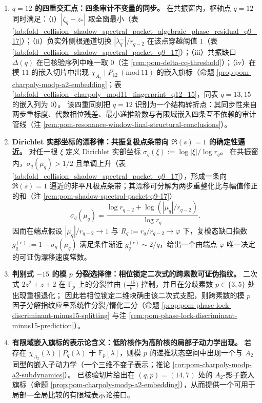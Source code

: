 \begin{enumerate}
  \item \textbf{\texorpdfstring{$q=12$}{q=12} 的四重交汇点：四条审计不变量的同步。}
  在共振窗内，枢轴点 \(q=12\) 同时满足：（i）\(|\zeta_q-z_\ast|\) 取全窗最小（表 \ref{tab:fold_collision_shadow_spectral_packet_algebraic_phase_residual_q9_17}）；（ii）负实外侧根通道切换 \(|\lambda_q^-|/r_{q-2}\) 在该点穿越阈值 \(1\)（表 \ref{tab:fold_collision_shadow_spectral_packet_q9_17}）；（iii）共振缺口 \(\Delta(q)\) 在已核验序列中唯一取 \(0\)（注 \ref{rem:pom-delta-cq-threshold}）；（iv）在模 \(11\) 的嵌入切片中出现 \(\chi_{A_2}\mid P_{12}\ (\mathrm{mod}\ 11)\) 的嵌入旗标（命题 \ref{prop:pom-charpoly-modp-a2-embedding}；表 \ref{tab:fold_collision_charpoly_mod11_fingerprint_q12_15}，同表 \(q=13,15\) 的嵌入列为 \(0\)）。
  该四重同刻把 \(q=12\) 识别为一个结构转折点：其同步性来自两步重标度、代数相位残差、最小递推阶数与有限域嵌入四条互不依赖的审计管线（注 \ref{rem:pom-resonance-window-final-structural-conclusions}）。

  \item \textbf{Dirichlet 实部坐标的漂移律：共振复极点条带向 \texorpdfstring{$\Re(s)=1$}{Re(s)=1} 的确定性逼近。}
  对任一根 \(\xi\) 定义 Dirichlet 实部坐标 \(\sigma_q(\xi):=\log|\xi|/\log r_q\)。
  在共振窗内，\(\sigma_q(\mu_q)>1/2\) 且单调上升（表 \ref{tab:fold_collision_shadow_spectral_packet_q9_17}），形成一条向 \(\Re(s)=1\) 逼近的非平凡极点条带；其漂移可分解为两步重整化比与幅值修正的和（注 \ref{rem:pom-shadow-spectral-packet-q9-17}）
  \[
  \sigma_q(\mu_q)=\frac{\log r_{q-2}+\log(|\mu_q|/r_{q-2})}{\log r_q}.
  \]
  因而在端点假设 \(|\mu_q|/r_{q-2}\to 1\) 与 \(R_q:=r_q/r_{q-2}\to\varphi\) 下，复模态缺口指数 \(g_q^{(c)}:=1-\sigma_q(\mu_q)\) 满足条件渐近 \(g_q^{(c)}\sim 2/q\)，给出一个由端点 \(\varphi\) 唯一决定的可证伪漂移速度常数。

  \item \textbf{判别式 \texorpdfstring{$-15$}{-15} 的模 \texorpdfstring{$p$}{p} 分裂选择律：相位锁定二次式的跨素数可证伪指纹。}
  二次式 \(2z^2+z+2\) 在 \(\mathbb{F}_p\) 上的分裂性由 \(\bigl(\frac{-15}{p}\bigr)\) 控制，并且在分歧素数 \(p\in\{3,5\}\) 处出现重根退化；
  因此若相位锁定二维块确由该二次式支配，则跨素数的模 \(p\) 因子分解指纹应呈系统性分裂/惰化二分（命题 \ref{prop:pom-phase-lock-discriminant-minus15-splitting} 与注 \ref{rem:pom-phase-lock-discriminant-minus15-prediction}）。

  \item \textbf{有限域嵌入旗标的表示论含义：低阶核作为高阶核的局部子动力学出现。}
  若存在 \(\chi_{A_2}(\lambda)\mid P_q(\lambda)\) 于 \(\mathbb{F}_p[\lambda]\)，则模 \(p\) 的递推状态空间中出现一个与 \(A_2\) 同型的嵌入子动力学（一个三维不变子表示；推论 \ref{cor:pom-charpoly-modp-a2-subdynamics}）。
  已核验切片给出在 \((q,p)=(14,7)\) 处的 \(A_2\)-影子嵌入旗标（命题 \ref{prop:pom-charpoly-modp-a2-embedding}），从而提供一个可用于局部—全局比较的有限域表示论接口。


\end{enumerate}
